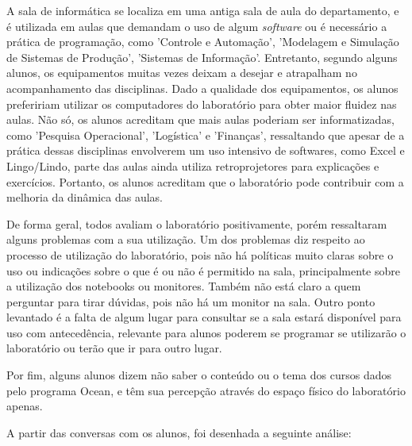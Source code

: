 A sala de informática se localiza em uma antiga sala de aula do departamento, e é utilizada em aulas que demandam o uso de algum \textit{software} ou é necessário a prática de programação, como 'Controle e Automação', 'Modelagem e Simulação de Sistemas de Produção', 'Sistemas de Informação'. Entretanto, segundo alguns alunos, os equipamentos muitas vezes deixam a desejar e atrapalham no acompanhamento das disciplinas. Dado a qualidade dos equipamentos, os alunos prefeririam utilizar os computadores do laboratório para obter maior fluidez nas aulas. Não só, os alunos acreditam que mais aulas poderiam ser informatizadas, como 'Pesquisa Operacional', 'Logística' e 'Finanças', ressaltando que apesar de a prática dessas disciplinas envolverem um uso intensivo de softwares, como Excel e Lingo/Lindo, parte das aulas ainda utiliza retroprojetores para explicações e exercícios. Portanto, os alunos acreditam que o laboratório pode contribuir com a melhoria da dinâmica das aulas.

De forma geral, todos avaliam o laboratório positivamente, porém ressaltaram alguns problemas com a sua utilização. Um dos problemas diz respeito ao processo de utilização do laboratório, pois não há políticas muito claras sobre o uso ou indicações sobre o que é ou não é permitido na sala, principalmente sobre a utilização dos notebooks ou monitores. Também não está claro a quem perguntar para tirar dúvidas, pois não há um monitor na sala. Outro ponto levantado é a falta de algum lugar para consultar se a sala estará disponível para uso com antecedência, relevante para alunos poderem se programar se utilizarão o laboratório ou terão que ir para outro lugar.

Por fim, alguns alunos dizem não saber o conteúdo ou o tema dos cursos dados pelo programa Ocean, e têm sua percepção através do espaço físico do laboratório apenas. 

A partir das conversas com os alunos, foi desenhada a seguinte análise:

